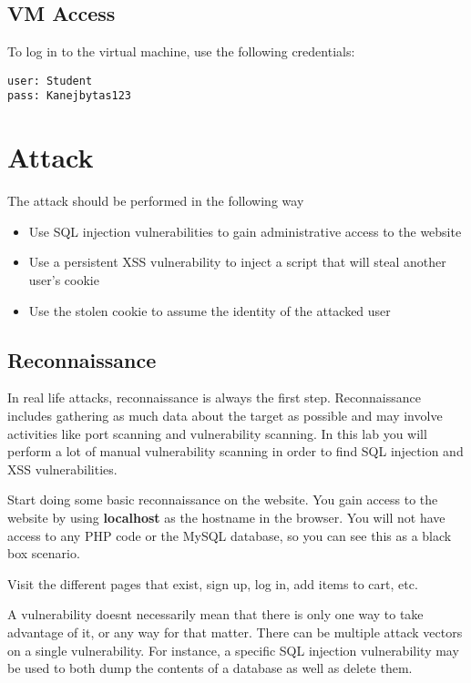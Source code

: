 \documentclass[EITN41]{../tex/cryptosecuritylab}
\begin{document}
\subsection*{VM Access}
To log in to the virtual machine, use the following credentials:
\begin{verbatim}
user: Student
pass: Kanejbytas123
\end{verbatim}


\section{Attack}
The attack should be performed in the following way
\begin{itemize}
\item Use SQL injection vulnerabilities to gain administrative access to the website
\item Use a persistent XSS vulnerability to inject a script that will steal another user's cookie
\item Use the stolen cookie to assume the identity of the attacked user
\end{itemize}
\subsection{Reconnaissance} 
In real life attacks, reconnaissance is always the first step. 
Reconnaissance includes gathering as much data about the target as possible 
and may involve activities like port scanning and vulnerability scanning. 
In this lab you will perform a lot of manual vulnerability scanning in order 
to find SQL injection and XSS vulnerabilities. 

Start doing some basic reconnaissance on the website. 
You gain access to the website by using \textbf{localhost} as the hostname in the browser. 
You will not have access to any PHP code or the MySQL database, 
so you can see this as a black box scenario.

Visit the different pages that exist, sign up, log in, add items to cart, etc.

A vulnerability doesnt necessarily mean that there is only one way to take advantage of it, 
or any way for that matter. There can be multiple attack vectors on a single vulnerability. 
For instance, a specific SQL injection vulnerability may be used to both dump the contents 
of a database as well as delete them.
\end{document}
